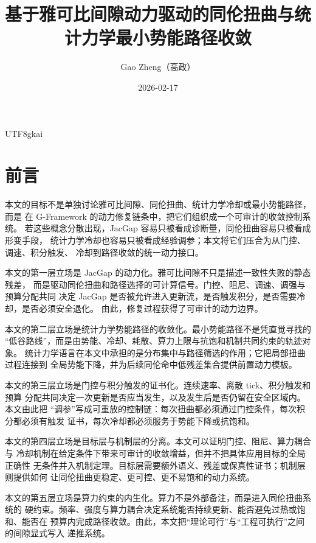 \documentclass[12pt]{article}
\newcommand{\GFramework}{\textsf{G-Framework}}
\begin{document}
\begin{CJK*}{UTF8}{gkai}

\title{基于雅可比间隙动力驱动的同伦扭曲与统计力学最小势能路径收敛}
\author{Gao Zheng（高政）}
\date{2026-02-17}
\maketitle

\section*{前言}

本文的目标不是单独讨论雅可比间隙、同伦扭曲、统计力学冷却或最小势能路径，而是
在 \GFramework{} 的动力修复链条中，把它们组织成一个可审计的收敛控制系统。
若这些概念分散出现，JacGap 容易只被看成诊断量，同伦扭曲容易只被看成形变手段，
统计力学冷却也容易只被看成经验调参；本文将它们压合为从门控、调速、积分触发、
冷却到路径收敛的统一动力接口。

本文的第一层立场是 JacGap 的动力化。雅可比间隙不只是描述一致性失败的静态残差，
而是驱动同伦扭曲和路径选择的可计算信号。门控、阻尼、调速、调强与预算分配共同
决定 JacGap 是否被允许进入更新流，是否触发积分，是否需要冷却，是否必须安全退化。
由此，修复过程获得了可审计的动力边界。

本文的第二层立场是统计力学势能路径的收敛化。最小势能路径不是凭直觉寻找的
“低谷路线”，而是由势能、冷却、耗散、算力上限与抗饱和机制共同约束的轨迹对象。
统计力学语言在本文中承担的是分布集中与路径筛选的作用；它把局部扭曲过程连接到
全局势能下降，并为后续同伦命中低残差集合提供前置动力模板。

本文的第三层立场是门控与积分触发的证书化。连续速率、离散 tick、积分触发和预算
分配共同决定一次更新是否应当发生，以及发生后是否仍留在安全区域内。本文由此把
“调参”写成可重放的控制链：每次扭曲都必须通过门控条件，每次积分都必须有触发
证书，每次冷却都必须服务于势能下降或抗饱和。

本文的第四层立场是目标层与机制层的分离。本文可以证明门控、阻尼、算力耦合与
冷却机制在给定条件下带来可审计的收敛增益，但并不把具体应用目标的全局正确性
无条件并入机制定理。目标层需要额外语义、残差或保真性证书；机制层则提供如何
让同伦扭曲更稳定、更可控、更不易饱和的动力系统。

本文的第五层立场是算力约束的内生化。算力不是外部备注，而是进入同伦扭曲系统的
硬约束。频率、强度与算力耦合决定系统能否持续更新、能否避免过热或饱和、能否在
预算内完成路径收敛。由此，本文把“理论可行”与“工程可执行”之间的间隙显式写入
递推系统。


\end{CJK*}
\end{document}
